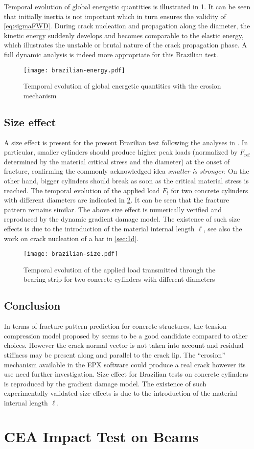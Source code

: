 Temporal evolution of global energetic quantities is illustrated in \cref{fig:brazilian_e}. It can be seen that initially inertia is not important which in turn ensures the validity of \eqref{eq:sigmaFWD}. During crack nucleation and propagation along the diameter, the kinetic energy suddenly develops and becomes comparable to the elastic energy, which illustrates the unstable or brutal nature of the crack propagation phase. A full dynamic analysis is indeed more appropriate for this Brazilian test.
\begin{figure}[htbp]
\centering
\texttt{[image: brazilian-energy.pdf]}
\caption{Temporal evolution of global energetic quantities with the erosion mechanism} \label{fig:brazilian_e}
\end{figure}

\subsection{Size effect}
A size effect is present for the present Brazilian test following the analyses in \cite{RoccoGuineaPlanasElices:1999,RuizOrtizPandolfi:2000}. In particular, smaller cylinders should produce higher peak loads (normalized by $F_\mathrm{ref}$ determined by the material critical stress and the diameter) at the onset of fracture, confirming the commonly acknowledged idea \emph{smaller is stronger}. On the other hand, bigger cylinders should break as soon as the critical material stress is reached. The temporal evolution of the applied load $F_t$ for two concrete cylinders with different diameters are indicated in \cref{fig:brazilian_size}. It can be seen that the fracture pattern remains similar. The above size effect is numerically verified and reproduced by the dynamic gradient damage model. The existence of such size effects is due to the introduction of the material internal length $\ell$, see also the work on crack nucleation of a bar in \cref{sec:1d}.
\begin{figure}[htbp]
\centering
\texttt{[image: brazilian-size.pdf]}
\caption{Temporal evolution of the applied load transmitted through the bearing strip for two concrete cylinders with different diameters} \label{fig:brazilian_size}
\end{figure}

\subsection*{Conclusion}
In terms of fracture pattern prediction for concrete structures, the tension-compression model proposed by \cite{FreddiRoyer-Carfagni:2010} seems to be a good candidate compared to other choices. However the crack normal vector is not taken into account and residual stiffness may be present along and parallel to the crack lip. The ``erosion'' mechanism available in the EPX software could produce a real crack however its use need further investigation. Size effect for Brazilian tests on concrete cylinders is reproduced by the gradient damage model. The existence of such experimentally validated size effects is due to the introduction of the material internal length $\ell$.

\section{CEA Impact Test on Beams} \label{sec:beam}